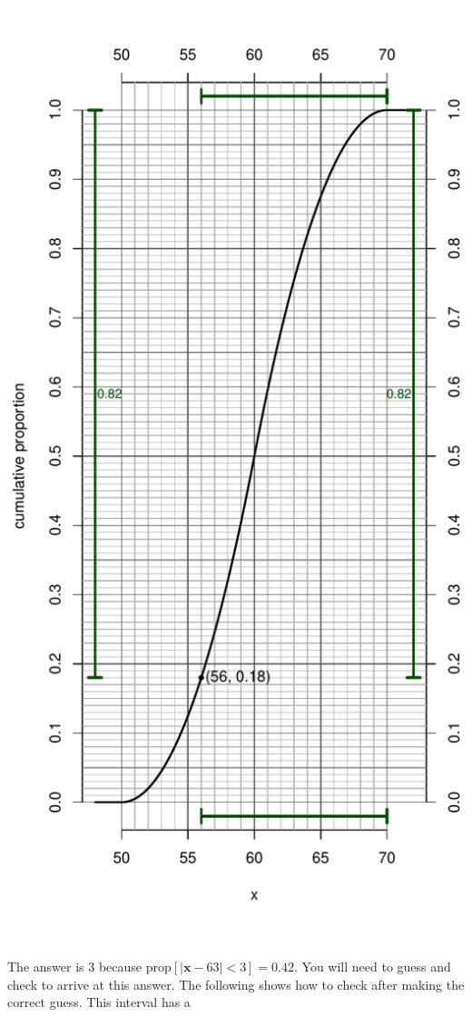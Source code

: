 \begin{solution}
\begin{answerlist}
\includegraphics{unnamed-chunk-19-1.pdf} ~
  \item The answer is 3 because \(\text{prop}[|\mathbf{x}-63|<3]=0.42\). You
will need to guess and check to arrive at this answer. The following
shows how to check after making the correct guess. This interval has a

\end{answerlist}
\end{solution}
